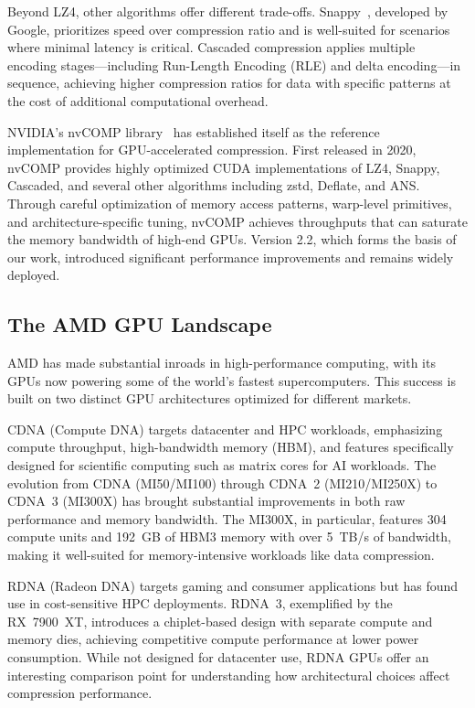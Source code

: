 \documentclass[runningheads]{llncs}
\begin{document}
Beyond LZ4, other algorithms offer different trade-offs. Snappy~\cite{snappy}, developed by Google, prioritizes speed over compression ratio and is well-suited for scenarios where minimal latency is critical. Cascaded compression applies multiple encoding stages---including Run-Length Encoding (RLE) and delta encoding---in sequence, achieving higher compression ratios for data with specific patterns at the cost of additional computational overhead.

NVIDIA's nvCOMP library~\cite{nvcomp} has established itself as the reference implementation for GPU-accelerated compression. First released in 2020, nvCOMP provides highly optimized CUDA implementations of LZ4, Snappy, Cascaded, and several other algorithms including zstd, Deflate, and ANS. Through careful optimization of memory access patterns, warp-level primitives, and architecture-specific tuning, nvCOMP achieves throughputs that can saturate the memory bandwidth of high-end GPUs. Version 2.2, which forms the basis of our work, introduced significant performance improvements and remains widely deployed.

\subsection{The AMD GPU Landscape}

AMD has made substantial inroads in high-performance computing, with its GPUs now powering some of the world's fastest supercomputers. This success is built on two distinct GPU architectures optimized for different markets.

CDNA (Compute DNA) targets datacenter and HPC workloads, emphasizing compute throughput, high-bandwidth memory (HBM), and features specifically designed for scientific computing such as matrix cores for AI workloads. The evolution from CDNA (MI50/MI100) through CDNA~2 (MI210/MI250X) to CDNA~3 (MI300X) has brought substantial improvements in both raw performance and memory bandwidth. The MI300X, in particular, features 304 compute units and 192~GB of HBM3 memory with over 5~TB/s of bandwidth, making it well-suited for memory-intensive workloads like data compression.

RDNA (Radeon DNA) targets gaming and consumer applications but has found use in cost-sensitive HPC deployments. RDNA~3, exemplified by the RX~7900~XT, introduces a chiplet-based design with separate compute and memory dies, achieving competitive compute performance at lower power consumption. While not designed for datacenter use, RDNA GPUs offer an interesting comparison point for understanding how architectural choices affect compression performance.
\end{document}
